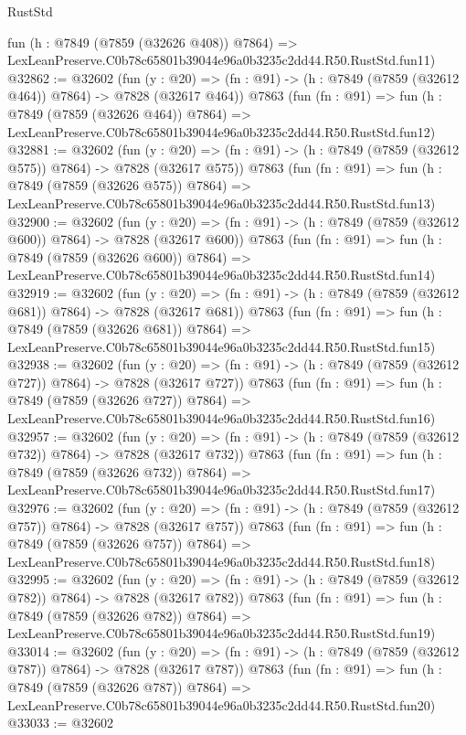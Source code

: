 \begin{lexlean}{RustStd}
\begin{coremodule}
    fun (h : @7849 (@7859 (@32626 @408)) @7864) =>
    LexLeanPreserve.C0b78c65801b39044e96a0b3235c2dd44.R50.RustStd.fun11)
@32862 := @32602
    (fun (y : @20) => (fn : @91) -> (h : @7849 (@7859 (@32612 @464)) @7864) -> @7828 (@32617 @464))
    @7863
    (fun (fn : @91) =>
    fun (h : @7849 (@7859 (@32626 @464)) @7864) =>
    LexLeanPreserve.C0b78c65801b39044e96a0b3235c2dd44.R50.RustStd.fun12)
@32881 := @32602
    (fun (y : @20) => (fn : @91) -> (h : @7849 (@7859 (@32612 @575)) @7864) -> @7828 (@32617 @575))
    @7863
    (fun (fn : @91) =>
    fun (h : @7849 (@7859 (@32626 @575)) @7864) =>
    LexLeanPreserve.C0b78c65801b39044e96a0b3235c2dd44.R50.RustStd.fun13)
@32900 := @32602
    (fun (y : @20) => (fn : @91) -> (h : @7849 (@7859 (@32612 @600)) @7864) -> @7828 (@32617 @600))
    @7863
    (fun (fn : @91) =>
    fun (h : @7849 (@7859 (@32626 @600)) @7864) =>
    LexLeanPreserve.C0b78c65801b39044e96a0b3235c2dd44.R50.RustStd.fun14)
@32919 := @32602
    (fun (y : @20) => (fn : @91) -> (h : @7849 (@7859 (@32612 @681)) @7864) -> @7828 (@32617 @681))
    @7863
    (fun (fn : @91) =>
    fun (h : @7849 (@7859 (@32626 @681)) @7864) =>
    LexLeanPreserve.C0b78c65801b39044e96a0b3235c2dd44.R50.RustStd.fun15)
@32938 := @32602
    (fun (y : @20) => (fn : @91) -> (h : @7849 (@7859 (@32612 @727)) @7864) -> @7828 (@32617 @727))
    @7863
    (fun (fn : @91) =>
    fun (h : @7849 (@7859 (@32626 @727)) @7864) =>
    LexLeanPreserve.C0b78c65801b39044e96a0b3235c2dd44.R50.RustStd.fun16)
@32957 := @32602
    (fun (y : @20) => (fn : @91) -> (h : @7849 (@7859 (@32612 @732)) @7864) -> @7828 (@32617 @732))
    @7863
    (fun (fn : @91) =>
    fun (h : @7849 (@7859 (@32626 @732)) @7864) =>
    LexLeanPreserve.C0b78c65801b39044e96a0b3235c2dd44.R50.RustStd.fun17)
@32976 := @32602
    (fun (y : @20) => (fn : @91) -> (h : @7849 (@7859 (@32612 @757)) @7864) -> @7828 (@32617 @757))
    @7863
    (fun (fn : @91) =>
    fun (h : @7849 (@7859 (@32626 @757)) @7864) =>
    LexLeanPreserve.C0b78c65801b39044e96a0b3235c2dd44.R50.RustStd.fun18)
@32995 := @32602
    (fun (y : @20) => (fn : @91) -> (h : @7849 (@7859 (@32612 @782)) @7864) -> @7828 (@32617 @782))
    @7863
    (fun (fn : @91) =>
    fun (h : @7849 (@7859 (@32626 @782)) @7864) =>
    LexLeanPreserve.C0b78c65801b39044e96a0b3235c2dd44.R50.RustStd.fun19)
@33014 := @32602
    (fun (y : @20) => (fn : @91) -> (h : @7849 (@7859 (@32612 @787)) @7864) -> @7828 (@32617 @787))
    @7863
    (fun (fn : @91) =>
    fun (h : @7849 (@7859 (@32626 @787)) @7864) =>
    LexLeanPreserve.C0b78c65801b39044e96a0b3235c2dd44.R50.RustStd.fun20)
@33033 := @32602

\end{coremodule}
\end{lexlean}
